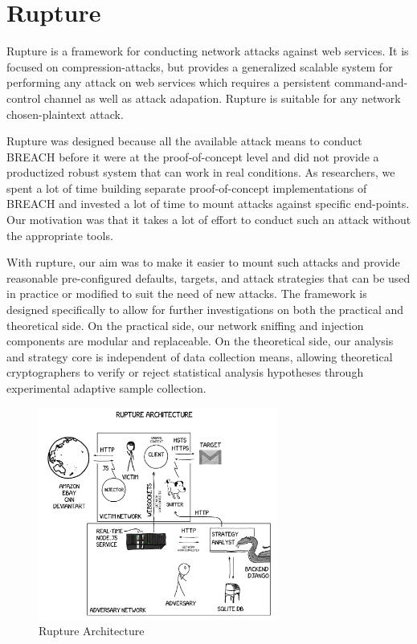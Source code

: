 \documentclass[a4paper, 11 pt, conference]{article}  %
\begin{document}
\section{Rupture}

Rupture is a framework for conducting network attacks against web services. It
is focused on compression-attacks, but provides a generalized scalable system
for performing any attack on web services which requires a persistent
command-and-control channel as well as attack adapation.
Rupture is suitable for any network chosen-plaintext attack.

Rupture was designed because all the available attack means to conduct BREACH
before it were at the proof-of-concept level and
did not provide a productized robust system that can work in real conditions. As
researchers, we spent a lot of time building separate proof-of-concept
implementations of BREACH and invested a lot of time to mount attacks against
specific end-points. Our motivation was that it takes a lot of effort to conduct
such an attack without the appropriate tools.

With rupture, our aim was to make it easier to mount such attacks and provide
reasonable pre-configured defaults, targets, and attack strategies that can be
used in practice or modified to suit the need of new attacks. The framework is
designed specifically to allow for further investigations on both the practical
and theoretical side. On the practical side, our network sniffing and injection
components are modular and replaceable. On the theoretical side, our analysis
and strategy core is independent of data collection means, allowing theoretical
cryptographers to verify or reject statistical analysis hypotheses through
experimental adaptive sample collection.

   \begin{figure}[thpb]
      \centering
      \includegraphics[width=0.7\textwidth]{figures/architecture.png}
      \caption{Rupture Architecture}
   \end{figure}
\end{document}
